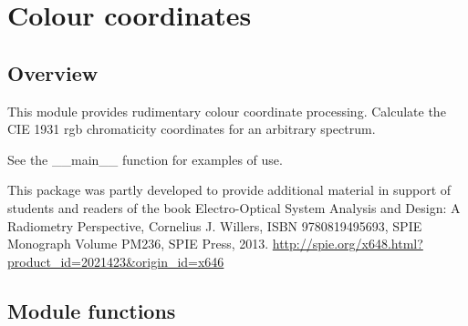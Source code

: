 \documentclass[a4paper,10pt,english]{sphinxmanual}
\begin{document}
\chapter{Colour coordinates}
\label{rychroma:colour-coordinates}\label{rychroma::doc}

\section{Overview}
\label{rychroma:overview}\label{rychroma:module-pyradi.rychroma}
This module provides rudimentary colour coordinate processing.
Calculate the CIE 1931 rgb chromaticity coordinates for an arbitrary spectrum.

See the \_\_main\_\_ function for examples of use.

This package was partly developed to provide additional material in support of students 
and readers of the book Electro-Optical System Analysis and Design: A Radiometry 
Perspective,  Cornelius J. Willers, ISBN 9780819495693, SPIE Monograph Volume
PM236, SPIE Press, 2013.  \href{http://spie.org/x648.html?product\_id=2021423\&origin\_id=x646}{http://spie.org/x648.html?product\_id=2021423\&origin\_id=x646}


\section{Module functions}
\label{rychroma:module-functions}
\end{document}

